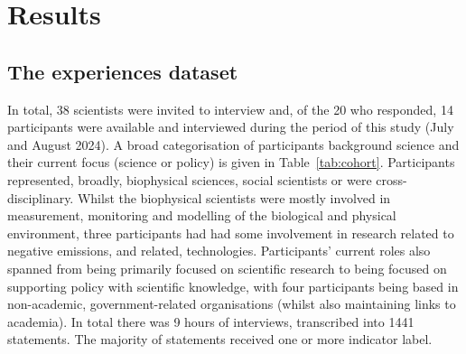\chapter{Results}\label{ch:results}

\section{The experiences dataset}\label{sec:resdataset}
In total, 38 scientists were invited to interview and, of the 20 who responded, 14 participants were available and interviewed during the period of this study (July and August 2024). A broad categorisation of participants background science and their current focus (science or policy) is given in Table~\ref{tab:cohort}. Participants represented, broadly, biophysical sciences, social scientists or were cross-disciplinary. Whilst the biophysical scientists were mostly involved in measurement, monitoring and modelling of the biological and physical environment, three participants had had some involvement in research related to negative emissions, and related, technologies. Participants' current roles also spanned from being primarily focused on scientific research to being focused on supporting policy with scientific knowledge, with four participants being based in non-academic, government-related organisations (whilst also maintaining links to academia). In total there was 9\textonehalf{} hours of interviews, transcribed into 1441 statements. The majority of statements received one or more indicator label.



